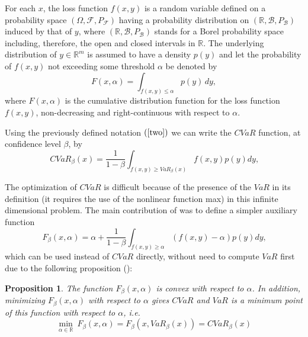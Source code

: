 \documentclass[a4paper,10pt]{article}
\newtheorem{proposition}{Proposition}
\begin{document}
\bigskip

For each $x$, the loss function $f\left( x,y\right) $ is a random variable
defined on a probability space $\left( \Omega ,\mathcal{F},P_{\mathcal{F}%
}\right) $ having a probability distribution on $\left(
\mathbb{R}
,\mathcal{B},P_{\mathcal{B}}\right) $ induced by that of $y$, where $\left(
\mathbb{R}
,\mathcal{B},P_{\mathcal{B}}\right) $ stands for a Borel probability space
including, therefore, the open and closed intervals in $%
\mathbb{R}
$. The underlying distribution of $y\in
\mathbb{R}
^{m}$ is assumed to have a density $p(y)$ and let the probability of $f\left( x,y\right) $ not exceeding some threshold $\alpha$ be denoted by
\begin{equation}
F(x,\alpha)=\int_{f(x,y)\leq \alpha}p(y)\,dy,  \label{four}
\end{equation}
where $F(x,\alpha)$ is the cumulative distribution function for the loss function $f\left( x,y\right) $, non-decreasing and right-continuous with respect to $\alpha$.

Using the previously defined notation $\left( \ref{two}\right) $ we can
write the $CVaR$ function, at confidence level $\beta $, by%
\begin{equation}
CVaR_{\beta }\left( x\right) = \frac{1}{1-\beta }\int_{f(x,y)\geq VaR_{\beta
	}\left( x\right) }f(x,y)p(y)dy\text{,}  \label{five}
\end{equation}

The optimization of $CVaR$ is difficult because of the presence of the $VaR$
in its definition (it requires the use of the nonlinear function max) in
this infinite dimensional problem. The main contribution of \citet*{%
	rockafellar2000} was to define a simpler auxiliary function
\begin{equation}
F_{\beta }\left( x,\alpha \right) = \alpha +\frac{1}{1-\beta }%
\int_{f(x,y)\geq \alpha }\left( f(x,y)-\alpha \right) p(y)dy\text{,}
\label{six}
\end{equation}%
which can be used instead of $CVaR$ directly, without need to compute $VaR$
first due to the following proposition (\citet*{pflug2000}): \bigskip

\begin{proposition}
	The function $F_{\beta }\left( x,\alpha \right) $ is convex with respect to $%
	\alpha $. In addition, minimizing $F_{\beta }\left( x,\alpha \right) $ with
	respect to $\alpha $ gives $CVaR$ and $VaR$ is a minimum point of this
	function with respect to $\alpha $, i.e.
	\begin{equation}
	\underset{\alpha \in
		\mathbb{R}
	}{\min }~F_{\beta }\left( x,\alpha \right) =F_{\beta }\left( x,VaR_{\beta
	}\left( x\right) \right) =CVaR_{\beta }(x)  \label{seven}
	\end{equation}
\end{proposition}
\end{document}
